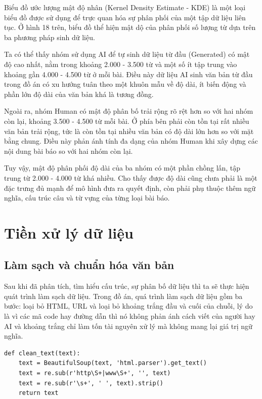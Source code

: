 \noindent
Biểu đồ ước lượng mật độ nhân (Kernel Density Estimate - KDE) là một loại biểu đồ được sử dụng để trực quan hóa sự phân phối của một tập dữ liệu liên tục. Ở hình 18 trên, biểu đồ thể hiện mật dộ của phân
phối số lượng từ dựa trên ba phương pháp sinh dữ liệu. 

\vspace{\baselineskip}
\noindent
Ta có thể thấy nhóm sử dụng AI để tự sinh dữ liệu từ đầu (Generated) có mật độ cao nhất, nằm trong khoảng 2.000 - 3.500 từ và một số ít tập trung vào khoảng gần 4.000 - 4.500 từ ở mỗi bài. Điều này dữ liệu AI sinh văn bản
từ đầu trong đồ án có xu hướng tuân theo một khuôn mẫu về độ dài, ít biến động và phần lớn độ dài của văn bản khá là tương đồng.

\vspace{\baselineskip}
\noindent
Ngoài ra, nhóm Human có mật độ phân bố trải rộng rõ rệt hơn so với hai nhóm còn lại, khoảng 3.500 - 4.500 từ mỗi bài. Ở phía bên phải còn tồn tại rất nhiều văn bản trải rộng, tức là còn tồn tại nhiều văn bản có độ dài lớn
hơn so với mặt bằng chung. Điều này phản ánh tính đa dạng của nhóm Human khi xây dựng các nội dung bài báo so với hai nhóm còn lại. 

\vspace{\baselineskip}
\noindent
Tuy vậy, mật độ phân phối độ dài của ba nhóm có một phần chồng lấn, tập trung từ 2.000 - 4.000 từ khá nhiều. Cho thấy được độ dài cũng chưa phải là một đặc trưng đủ mạnh để mô hình đưa ra quyết định, còn phải phụ thuộc thêm ngữ nghĩa,
cấu trúc câu và từ vựng của từng loại bài báo.


\section{Tiền xử lý dữ liệu}
\subsection{Làm sạch và chuẩn hóa văn bản}
Sau khi đã phân tích, tìm hiểu cấu trúc, sự phân bố dữ liệu thì ta sẽ thực hiện quát trình làm sạch dữ liệu. Trong đồ án, quá trình làm sạch dữ liệu gồm ba bước: loại bỏ HTML, URL và loại bỏ khoảng trắng đầu và cuối của chuỗi, lý do là vì các mã code hay đường dẫn thì nó
không phản ánh cách viết của người hay AI và khoảng trắng chỉ làm tốn tài nguyên xử lý mà không mang lại giá trị ngữ nghĩa.

\begin{lstlisting}[style=pythoncode]
def clean_text(text):
    text = BeautifulSoup(text, 'html.parser').get_text()
    text = re.sub(r'http\S+|www\S+', '', text)
    text = re.sub(r'\s+', ' ', text).strip()
    return text
\end{lstlisting}

